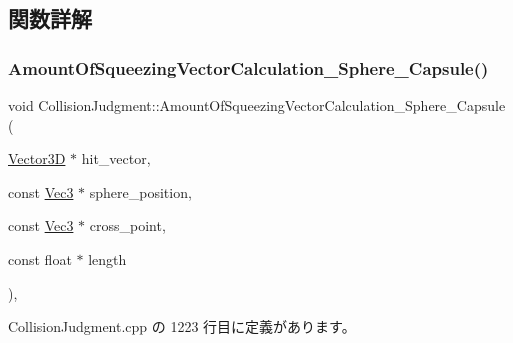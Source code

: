 \subsection{関数詳解}
\mbox{\label{class_collision_judgment_ae992df185735a5348aef01754ebf9b80}} 
\subsubsection{\texorpdfstring{Amount\+Of\+Squeezing\+Vector\+Calculation\+\_\+\+Sphere\+\_\+\+Capsule()}{AmountOfSqueezingVectorCalculation\_Sphere\_Capsule()}}
{\footnotesize\ttfamily void Collision\+Judgment\+::\+Amount\+Of\+Squeezing\+Vector\+Calculation\+\_\+\+Sphere\+\_\+\+Capsule (\begin{DoxyParamCaption}\item[{\mbox{\hyperlink{class_vector3_d}{Vector3D}} $\ast$}]{hit\+\_\+vector,  }\item[{const \mbox{\hyperlink{_vector3_d_8h_ab16f59e4393f29a01ec8b9bbbabbe65d}{Vec3}} $\ast$}]{sphere\+\_\+position,  }\item[{const \mbox{\hyperlink{_vector3_d_8h_ab16f59e4393f29a01ec8b9bbbabbe65d}{Vec3}} $\ast$}]{cross\+\_\+point,  }\item[{const float $\ast$}]{length }\end{DoxyParamCaption})\hspace{0.3cm}{\ttfamily [static]}, {\ttfamily [private]}}



 Collision\+Judgment.\+cpp の 1223 行目に定義があります。

